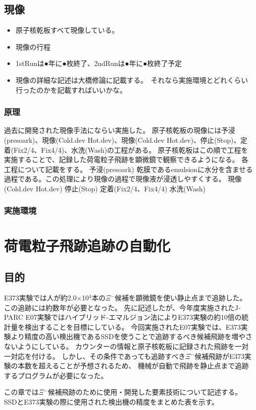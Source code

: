 \documentclass[12pt,a4paper]{jarticle}
\begin{document}
\subsection{現像}
\begin{itemize}
 \item 原子核乾板すべて現像している。
 \item 現像の行程
 \item 1stRunは●年に●枚終了、2ndRunは●年に●枚終了予定
 \item 現像の詳細な記述は大橋修論に記載する。　それなら実施環境とどれくらい行ったのかを記載すればいいかな。
\end{itemize}
\subsubsection{原理}
過去に開発された現像手法にならい実施した。
原子核乾板の現像には予浸(presoark)、現像(Cold.dev Hot.dev)、現像(Cold.dev Hot.dev)、停止(Stop)、定着(Fix2/4、Fix4/4)、水洗(Wash)の工程がある。
原子核乾板はこの順で工程を実施することで、記録した荷電粒子飛跡を顕微鏡で観察できるようになる。
各工程について記載をする。
予浸(presoark)
乾膜であるemulsionに水分を含ませる過程である。この処理により現像の過程で現像液が浸透しやすくする。
現像(Cold.dev Hot.dev)
停止(Stop)
定着(Fix2/4、Fix4/4)
水洗(Wash)
\subsubsection{実施環境}


\newpage
\section{荷電粒子飛跡追跡の自動化}
\subsection{目的}
E373実験では人が約2.0×10$^4$本の$\Xi$$^-$候補を顕微鏡を使い静止点まで追跡した。
この追跡には約数年が必要となった。
先に記述したが、今年度実施されたJ-PARC E07実験ではハイブリッド-エマルジョン法によりE373実験の約10倍の統計量を検出することを目標にしている。
今回実施されたE07実験では、E373実験より精度の高い検出機であるSSDを使うことで追跡するべき候補飛跡を増やさないようにしている。
カウンターの情報と原子核乾板に記録された飛跡を一対一対応を付ける。
しかし、その条件であっても追跡すべき$\Xi$$^-$候補飛跡がE373実験の本数を超えることが予想されるため、
機械が自動で飛跡を静止点まで追跡するプログラムが必要になった。
\par
この章では$\Xi$$^-$候補飛跡のために使用・開発した要素技術について記述する。
SSDとE373実験の際に使用された検出機の精度をまとめた表を示す。
\end{document}
